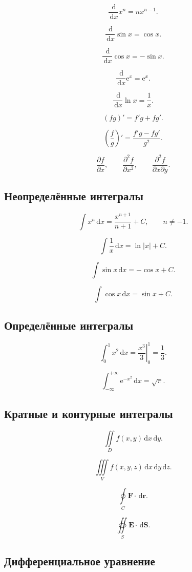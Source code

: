 \documentclass[12pt,a4paper]{article}
\theoremstyle{definition}
\theoremstyle{remark}
\newcommand{\vect}[1]{\bm{#1}}
\newcommand{\abs}[1]{\left|#1\right|}
\newcommand{\dd}{\,\mathrm{d}}
\newcommand{\e}{\mathrm{e}}
\begin{document}
\[
    \frac{\dd}{\dd x}x^n=nx^{n-1}.
\]

\[
    \frac{\dd}{\dd x}\sin x=\cos x.
\]

\[
    \frac{\dd}{\dd x}\cos x=-\sin x.
\]

\[
    \frac{\dd}{\dd x}\e^x=\e^x.
\]

\[
    \frac{\dd}{\dd x}\ln x=\frac{1}{x}.
\]

\[
    (fg)'=f'g+fg'.
\]

\[
    \left(\frac{f}{g}\right)'
    =
    \frac{f'g-fg'}{g^2}.
\]

\[
    \frac{\partial f}{\partial x},
    \qquad
    \frac{\partial^2 f}{\partial x^2},
    \qquad
    \frac{\partial^2 f}{\partial x\partial y}.
\]

\subsection{Неопределённые интегралы}

\[
    \int x^n\dd x
    =
    \frac{x^{n+1}}{n+1}+C,
    \qquad n\neq-1.
\]

\[
    \int\frac{1}{x}\dd x
    =
    \ln\abs{x}+C.
\]

\[
    \int\sin x\dd x
    =
    -\cos x+C.
\]

\[
    \int\cos x\dd x
    =
    \sin x+C.
\]

\subsection{Определённые интегралы}

\[
    \int_0^1 x^2\dd x
    =
    \left.\frac{x^3}{3}\right|_0^1
    =
    \frac{1}{3}.
\]

\[
    \int_{-\infty}^{+\infty}
    \e^{-x^2}\dd x
    =
    \sqrt{\pi}.
\]

\subsection{Кратные и контурные интегралы}

\[
    \iint\limits_D
    f(x,y)\dd x\dd y.
\]

\[
    \iiint\limits_V
    f(x,y,z)\dd x\dd y\dd z.
\]

\[
    \oint\limits_C
    \vect{F}\cdot\dd\vect{r}.
\]

\[
    \oiint\limits_S
    \vect{E}\cdot\dd\vect{S}.
\]

\subsection{Дифференциальное уравнение}
\end{document}
